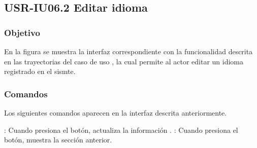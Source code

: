 \clearpage
\subsection{USR-IU06.2 Editar idioma}

\subsubsection{Objetivo}
En la figura  se muestra la interfaz correspondiente con la funcionalidad descrita en las
trayectorias del caso de uso  , la cual permite al actor editar un idioma registrado en el sismte.

\subsubsection{Comandos}
Los siguientes comandos aparecen en la interfaz descrita anteriormente.

\Titem {} : Cuando presiona el botón, actualiza la información .
\Titem {} : Cuando presiona el botón, muestra la sección anterior.%



\clearpage
